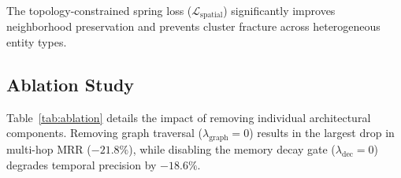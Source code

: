 The topology-constrained spring loss ($\mathcal{L}_{\text{spatial}}$) significantly improves neighborhood preservation and prevents cluster fracture across heterogeneous entity types.

\subsection{Ablation Study}
Table~\ref{tab:ablation} details the impact of removing individual architectural components. Removing graph traversal ($\lambda_{\text{graph}} = 0$) results in the largest drop in multi-hop MRR ($-21.8\%$), while disabling the memory decay gate ($\lambda_{\text{dec}} = 0$) degrades temporal precision by $-18.6\%$.

\begin{table}[t]
\centering
\caption{Component Ablation Study on Multi-Hop Benchmark}
\label{tab:ablation}
\end{table}
